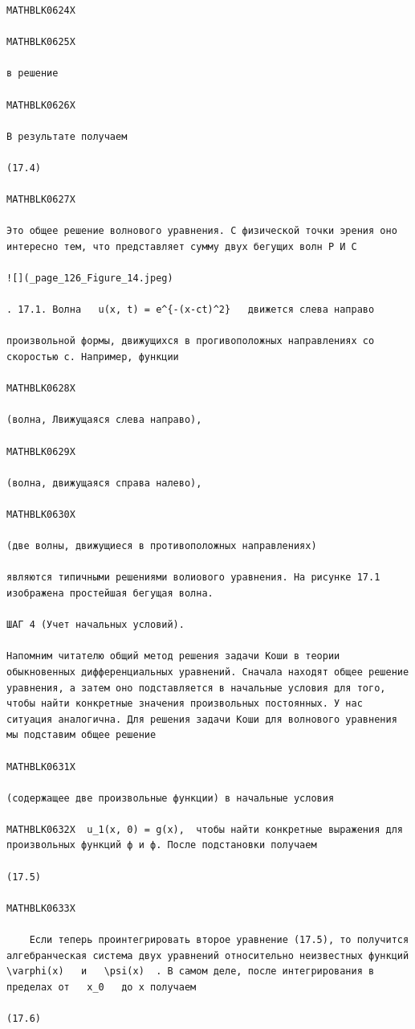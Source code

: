 \documentclass[
]{article}
\begin{document}
\begin{verbatim}
MATHBLK0624X

MATHBLK0625X

в решение

MATHBLK0626X

В результате получаем

(17.4)

MATHBLK0627X

Это общее решение волнового уравнения. С физической точки эрения оно интересно тем, что представляет сумму двух бегущих волн Р И С

![](_page_126_Figure_14.jpeg)

. 17.1. Волна   u(x, t) = e^{-(x-ct)^2}   движется слева направо

произвольной формы, движущихся в прогивоположных направлениях со скоростью c. Например, функции

MATHBLK0628X

(волна, Лвижущаяся слева направо),

MATHBLK0629X

(волна, движущаяся справа налево),

MATHBLK0630X

(две волны, движущиеся в противоположных направлениях)

являются типичными решениями волиового уравнения. На рисунке 17.1 изображена простейшая бегущая волна.

ШАГ 4 (Учет начальных условий).

Напомним читателю общий метод решения задачи Коши в теории обыкновенных дифференциальных уравнений. Сначала находят общее решение уравнения, а затем оно подставляется в начальные условия для того, чтобы найти конкретные значения произвольных постоянных. У нас ситуация аналогична. Для решения задачи Коши для волнового уравнения мы подставим общее решение

MATHBLK0631X

(содержащее две произвольные функции) в начальные условия

MATHBLK0632X  u_1(x, 0) = g(x),  чтобы найти конкретные выражения для произвольных функций ф и ф. После подстановки получаем

(17.5)

MATHBLK0633X

    Если теперь проинтегрировать второе уравнение (17.5), то получится алгебранческая система двух уравнений относительно неизвестных функций   \varphi(x)   и   \psi(x)  . В самом деле, после интегрирования в пределах от   x_0   до x получаем

(17.6)


\end{verbatim}
\end{document}
